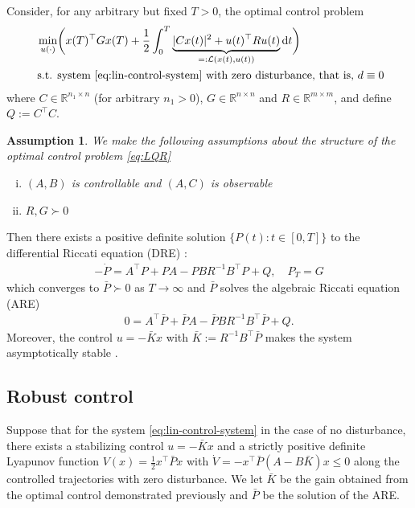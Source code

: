 \documentclass[10pt,a4paper]{amsart}
\newtheorem{assumption}{Assumption}
\newcommand{\tp}{^\top}
\newcommand{\inv}{^{-1}}
\newcommand{\R}{\mathbb{R}}
\newcommand{\half}{\frac{1}{2}}
\newcommand{\ud}{\mathrm{d}}
\renewcommand{\L}{\mathcal{L}}
\begin{document}
Consider, for any arbitrary but fixed $T > 0$, the optimal control problem
\begin{subequations}
\begin{align}
\min_{u(\cdot)} & \bigg( x(T) \tp G x(T) + \half\int_{0}^{T} \underbrace{|Cx(t)|^2 + u(t)\tp R u(t)}_{=: \L(x(t),u(t))} \ud t \bigg)  \\
\text{ s.t. } & \text{system }\eqref{eq:lin-control-system} \text{ with zero disturbance, that is, } d \equiv 0
\end{align}
\label{eq:LQR}
\end{subequations}
where $C \in \R^{n_1 \times n}$ (for arbitrary $n_1 > 0$), $G \in \R^{n \times n}$ and $R \in \R^{m \times m}$, and  define $Q := C\tp C$. 
\begin{assumption}
We make the following assumptions about the structure of the optimal control problem \eqref{eq:LQR}
\begin{enumerate}[(i)]
\item $(A,B)$ is controllable and $(A,C)$ is observable
\item $R,G \succ 0$
\end{enumerate}

\end{assumption}
Then there exists a positive definite solution $\{P(t) : t \in [0,T]\}$ to the differential Riccati equation (DRE) \cite[Chapter 3]{k-sivan}:
\begin{align*}
-\dot{P} = A\tp P + PA - PBR\inv B\tp P + Q, \quad P_T = G
\end{align*}
which converges to $\bar{P} \succ 0$ as $T \to \infty$ and $\bar{P}$ solves the algebraic Riccati equation (ARE)
\begin{align*}
0 = A\tp \bar{P} + \bar{P}A - \bar{P}BR\inv B\tp \bar{P} + Q.
\end{align*}
Moreover, the control $u = -\bar{K}x$ with $\bar{K} := R\inv B\tp \bar{P}$ makes the system asymptotically stable \cite[Theorem 3.7]{k-sivan}. 

\subsection{Robust control}

Suppose that for the system \eqref{eq:lin-control-system} in the case of no disturbance, there exists a stabilizing control $u = -\bar{K}x$ and a strictly positive definite Lyapunov function $V(x) = \half x\tp \bar{P} x$ with $\dot{V} = -x\tp \bar{P}(A - B\bar{K})x \le 0$ along the controlled trajectories with zero disturbance. We let $\bar{K}$ be the gain obtained from the optimal control demonstrated previously and $\bar{P}$ be the solution of the ARE.  
\end{document}
